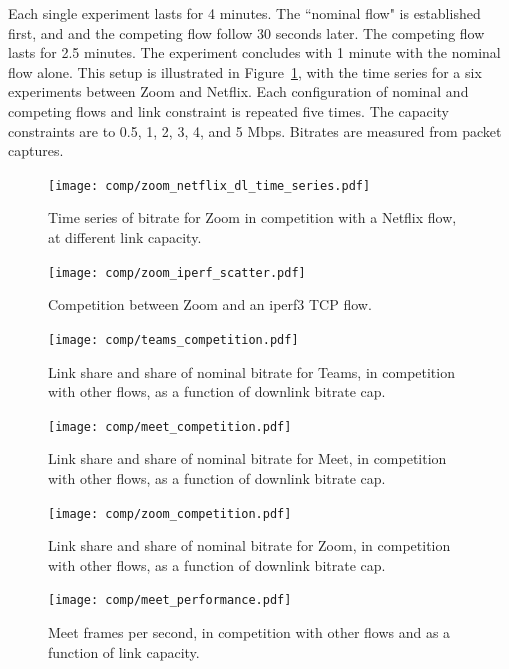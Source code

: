 Each single experiment lasts for 4 minutes.
The ``nominal flow" is established first, and
  and the competing flow follow 30 seconds later.
The competing flow lasts for 2.5 minutes.
The experiment concludes with 1 minute
  with the nominal flow alone.
This setup is illustrated in Figure~\ref{fig:ts_zoom_netflix},
  with the time series for a six experiments between Zoom and Netflix.
Each configuration of nominal and competing flows and link constraint
  is repeated five times.
The capacity constraints are to 0.5, 1, 2, 3, 4, and 5 Mbps.
Bitrates are measured from packet captures.
  
\begin{figure}[]
    \texttt{[image: comp/zoom\_netflix\_dl\_time\_series.pdf]}
    \caption{Time series of bitrate for Zoom in competition with a Netflix flow, at different link capacity. }
	\label{fig:ts_zoom_netflix}
\end{figure}

\begin{figure}[]
    \texttt{[image: comp/zoom\_iperf\_scatter.pdf]}
    \caption{Competition between Zoom and an iperf3 TCP flow. }
	\label{fig:comp_zoom_iperf}
\end{figure}

\begin{figure}[]
    \texttt{[image: comp/teams\_competition.pdf]}
    \caption{Link share and share of nominal bitrate for Teams, in competition with other flows, as a function of downlink bitrate cap. }
	\label{fig:teams_comp_bitrates}
\end{figure}

\begin{figure}[]
    \texttt{[image: comp/meet\_competition.pdf]}
    \caption{Link share and share of nominal bitrate for Meet, in competition with other flows, as a function of downlink bitrate cap.}
	\label{fig:meet_comp_bitrates}
\end{figure}

\begin{figure}[]
    \texttt{[image: comp/zoom\_competition.pdf]}
    \caption{Link share and share of nominal bitrate for Zoom, in competition with other flows, as a function of downlink bitrate cap.}
	\label{fig:zoom_comp_bitrates}
\end{figure}

\begin{figure}[]
    \texttt{[image: comp/meet\_performance.pdf]}
    \caption{Meet frames per second, in competition with other flows and as a function of link capacity.}
	\label{fig:meet_comp_performance}
\end{figure}



